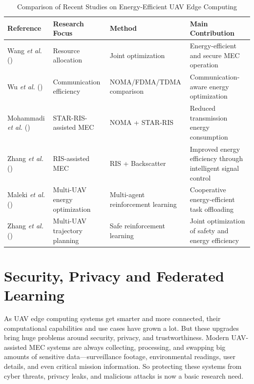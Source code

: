 \documentclass[a4paper, 12pt]{article}
\begin{document}
\begin{table}[ht]
\centering
\caption{Comparison of Recent Studies on Energy-Efficient UAV Edge Computing}
\label{tab:energy_comparison}
\begin{tabular}{|p{2.5cm}|p{3cm}|p{3cm}|p{3cm}|}
\hline
\textbf{Reference} &
\textbf{Research Focus} &
\textbf{Method} &
\textbf{Main Contribution}
\\
\hline

Wang \textit{et al.} (\cite{Wang2026Energy})
&
Resource allocation
&
Joint optimization
&
Energy-efficient and secure MEC operation
\\
\hline

Wu \textit{et al.} (\cite{Wu2026NOMA})
&
Communication efficiency
&
NOMA/FDMA/TDMA comparison
&
Communication-aware energy optimization
\\
\hline

Mohammadi \textit{et al.} (\cite{Mohammadi2026})
&
STAR-RIS-assisted MEC
&
NOMA + STAR-RIS
&
Reduced transmission energy consumption
\\
\hline

Zhang \textit{et al.} (\cite{Zhang2026RIS})
&
RIS-assisted MEC
&
RIS + Backscatter
&
Improved energy efficiency through intelligent signal control
\\
\hline

Maleki \textit{et al.} (\cite{Maleki2026})
&
Multi-UAV energy optimization
&
Multi-agent reinforcement learning
&
Cooperative energy-efficient task offloading
\\
\hline

Zhang \textit{et al.} (\cite{Zhang2026Safe})
&
Multi-UAV trajectory planning
&
Safe reinforcement learning
&
Joint optimization of safety and energy efficiency
\\
\hline

\end{tabular}
\end{table}



\section*{Security, Privacy and Federated Learning}
As UAV edge computing systems get smarter and more connected, their computational capabilities and use cases have grown a lot. But these upgrades bring huge problems around security, privacy, and trustworthiness. Modern UAV-assisted MEC systems are always collecting, processing, and swapping big amounts of sensitive data—surveillance footage, environmental readings, user details, and even critical mission information. So protecting these systems from cyber threats, privacy leaks, and malicious attacks is now a basic research need.
\end{document}
